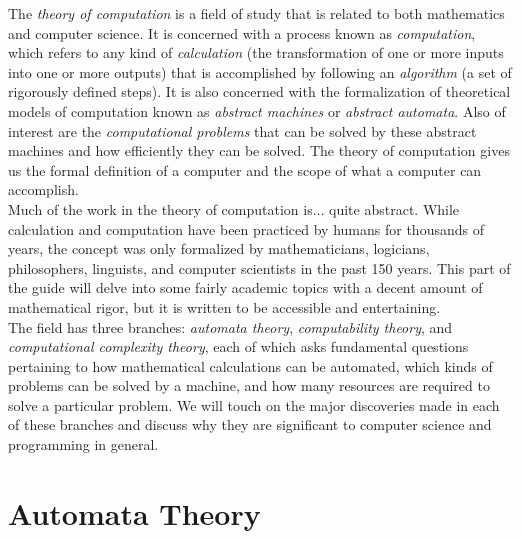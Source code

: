 The \textit{theory of computation} is a field of study that is related to both mathematics and computer science. It is concerned with a process known as \textit{computation}, which refers to any kind of \textit{calculation} (the transformation of one or more inputs into one or more outputs) that is accomplished by following an \textit{algorithm} (a set of rigorously defined steps). It is also concerned with the formalization of theoretical models of computation known as \textit{abstract machines} or \textit{abstract automata}. Also of interest are the \textit{computational problems} that can be solved by these abstract machines and how efficiently they can be solved. The theory of computation gives us the formal definition of a computer and the scope of what a computer can accomplish. \\

Much of the work in the theory of computation is$\dots$ quite abstract. While calculation and computation have been practiced by humans for thousands of years, the concept was only formalized by mathematicians, logicians, philosophers, linguists, and computer scientists in the past 150 years. This part of the guide will delve into some fairly academic topics with a decent amount of mathematical rigor, but it is written to be accessible and entertaining. \\

The field has three branches: \textit{automata theory}, \textit{computability theory}, and \textit{computational complexity theory}, each of which asks fundamental questions pertaining to how mathematical calculations can be automated, which kinds of problems can be solved by a machine, and how many resources are required to solve a particular problem. We will touch on the major discoveries made in each of these branches and discuss why they are significant to computer science and programming in general.



\toclineskip
\section{Automata Theory}


